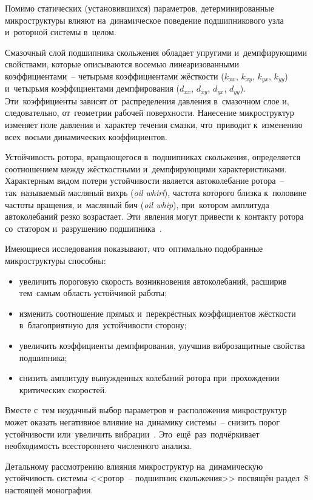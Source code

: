 Помимо статических (установившихся) параметров, детерминированные микроструктуры влияют на~динамическое поведение подшипникового узла и~роторной системы в~целом.

Смазочный слой подшипника скольжения обладает упругими и~демпфирующими свойствами, которые описываются восемью линеаризованными коэффициентами~-- четырьмя коэффициентами жёсткости ($k_{xx}$, $k_{xy}$, $k_{yx}$, $k_{yy}$) и~четырьмя коэффициентами демпфирования ($d_{xx}$, $d_{xy}$, $d_{yx}$, $d_{yy}$). Эти~коэффициенты зависят от~распределения давления в~смазочном слое и, следовательно, от~геометрии рабочей поверхности. Нанесение микроструктур изменяет поле давления и~характер течения смазки, что~приводит к~изменению всех~восьми динамических коэффициентов.

Устойчивость ротора, вращающегося в~подшипниках скольжения, определяется соотношением между жёсткостными и~демпфирующими характеристиками. Характерным видом потери устойчивости является автоколебание ротора~-- так~называемый масляный вихрь (\textit{oil whirl}), частота которого близка к~половине частоты вращения, и~масляный бич (\textit{oil whip}), при~котором амплитуда автоколебаний резко возрастает. Эти~явления могут привести к~контакту ротора со~статором и~разрушению подшипника~\cite{muszynska1988,goodwin1997}.

Имеющиеся исследования показывают, что~оптимально подобранные микроструктуры способны:
\begin{itemize}
\item увеличить пороговую скорость возникновения автоколебаний, расширив тем~самым область устойчивой работы;
\item изменить соотношение прямых и~перекрёстных коэффициентов жёсткости в~благоприятную для~устойчивости сторону;
\item увеличить коэффициенты демпфирования, улучшив виброзащитные свойства подшипника;
\item снизить амплитуду вынужденных колебаний ротора при~прохождении критических скоростей.
\end{itemize}

Вместе с~тем неудачный выбор параметров и~расположения микроструктур может оказать негативное влияние на~динамику системы~-- снизить порог устойчивости или~увеличить вибрации~\cite{rebufa2017}. Это~ещё~раз~подчёркивает необходимость всестороннего численного анализа.

Детальному рассмотрению влияния микроструктур на~динамическую устойчивость системы <<ротор~-- подшипник скольжения>> посвящён раздел~8 настоящей монографии.


